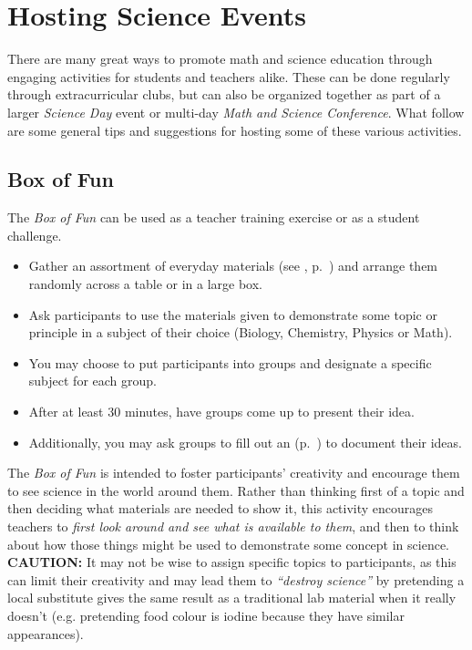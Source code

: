 \chapter{Hosting Science Events} 

There are many great ways to promote math and science education through engaging activities for students and teachers alike. These can be done regularly through extracurricular clubs, but can also be organized together as part of a larger \emph{Science Day} event or multi-day \emph{Math and Science Conference}. What follow are some general tips and suggestions for hosting some of these various activities.

\section{Box of Fun} 
The \emph{Box of Fun} can be used as a teacher training exercise or as a student challenge. 
\begin{itemize}
\item Gather an assortment of everyday materials (see , p.~\pageref{cha:local-mat-list}) and arrange them randomly across a table or in a large box. 
\item Ask participants to use the materials given to demonstrate some topic or principle in a subject of their choice (Biology, Chemistry, Physics or Math).
\item You may choose to put participants into groups and designate a specific subject for each group.
\item After at least 30 minutes, have groups come up to present their idea.
\item Additionally, you may ask groups to fill out an  (p.~\pageref{cha:activity-template}) to document their ideas.
\end{itemize}

The \emph{Box of Fun} is intended to foster participants' creativity and encourage them to see science in the world around them. Rather than thinking first of a topic and then deciding what materials are needed to show it, this activity encourages teachers to \emph{first look around and see what is available to them}, and then to think about how those things might be used to demonstrate some concept in science. \\

\noindent \textbf{CAUTION:} It may not be wise to assign specific topics to participants, as this can limit their creativity and may lead them to \emph{``destroy science''} by pretending a local substitute gives the same result as a traditional lab material when it really doesn't (e.g. pretending food colour is iodine because they have similar appearances). 

